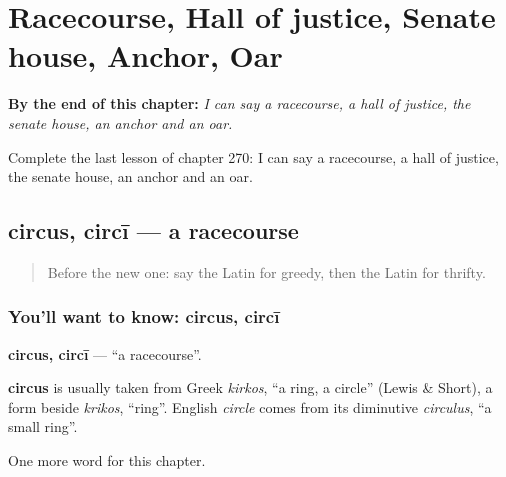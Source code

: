 
\chapter{Racecourse, Hall of justice, Senate house, Anchor, Oar}
\label{ch:la-racecourse-hall-of-justice-senate-house-anchor-oar}

\begin{chapteropening}
\textbf{By the end of this chapter:} \emph{I can say a racecourse, a hall of justice, the senate house, an anchor and an oar.}

Complete the last lesson of chapter 270: I can say a racecourse, a hall of justice, the senate house, an anchor and an oar.
\end{chapteropening}

\section[circus, circī]{circus, circī — a racecourse}

\label{lesson:LA-C270-circus}



\begin{quote}
Before the new one: say the Latin for greedy, then the Latin for thrifty.
\end{quote}

\subsection*{You'll want to know: circus, circī}
\textbf{circus, circī} — \textquotedblleft{}a racecourse\textquotedblright{}.

\begin{cousinweb}
\textbf{circus} is usually taken from Greek \emph{kirkos}, \textquotedblleft{}a ring, a circle\textquotedblright{} (Lewis \& Short), a form beside \emph{krikos}, \textquotedblleft{}ring\textquotedblright{}. English \emph{circle} comes from its diminutive \emph{circulus}, \textquotedblleft{}a small ring\textquotedblright{}.
\end{cousinweb}

\begin{grammarlens}[title={What you've built}]
One more word for this chapter.
\end{grammarlens}

